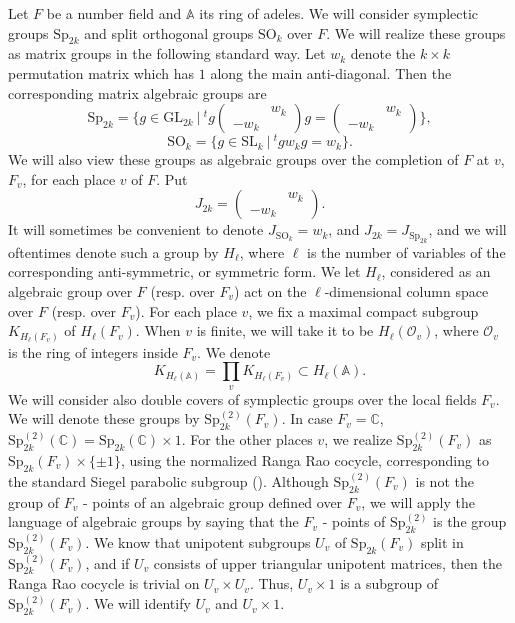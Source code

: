 \documentclass[12pts]{amsart}
\newcommand{\BA}{{\mathbb {A}}}
\newcommand{\BC}{{\mathbb {C}}}
\newcommand{\GL}{{\mathrm{GL}}}
\newcommand{\SL}{{\mathrm{SL}}}
\newcommand{\SO}{{\mathrm{SO}}}
\newcommand{\Sp}{{\mathrm{Sp}}}
\begin{document}
Let $F$ be a number field and $\BA$ its ring of adeles. We will
consider symplectic groups $\Sp_{2k}$ and split orthogonal groups
$\SO_k$ over $F$. We will realize these groups as matrix groups in
the following standard way. Let $w_k$ denote the $k\times k$
permutation matrix which has $1$ along the main anti-diagonal. Then
the corresponding matrix algebraic groups are
$$      
\Sp_{2k}=\{g\in \GL_{2k} \ |\
{}^tg\begin{pmatrix}&w_k\\-w_k\end{pmatrix}g=\begin{pmatrix}&w_k\\-w_k\end{pmatrix}
\},
$$
$$              
 \SO_k=\{g\in \SL_k \ |\ {}^tgw_kg=w_k\}.
$$
We will also view these groups as algebraic groups over the completion of $F$ at $v$, $F_v$, for each place $v$ of $F$. Put
\begin{equation}\label{1'.1}
J_{2k}=\begin{pmatrix}&w_k\\-w_k\end{pmatrix}.
\end{equation}
It will sometimes be convenient to denote $J_{\SO_k}=w_k$, and  $J_{2k}=J_{\Sp_{2k}}$, and
we will oftentimes denote such a group by $H_\ell$, where $\ell$ is the
number of variables of the corresponding anti-symmetric, or
symmetric form. We let $H_\ell$, considered as an algebraic group over $F$ (resp. over $F_v$) act on the $\ell$-dimensional column space over $F$ (resp. over $F_v$).  
For each place $v$, we fix a maximal compact subgroup $K_{H_\ell(F_v)}$ of $H_\ell(F_v)$. When $v$ is finite, we will take it to be $H_\ell(\mathcal{O}_v)$, where $\mathcal{O}_v$ is the ring of integers inside $F_v$. We denote
\begin{equation}\label{1'.2}
K_{H_\ell(\BA)}=\prod_v K_{H_\ell(F_v)}\subset H_\ell(\BA).
\end{equation}
We will consider also double covers of symplectic groups over the local fields $F_v$. We will denote these groups by $\Sp^{(2)}_{2k}(F_v)$. In case $F_v=\BC$, $\Sp_{2k}^{(2)}(\BC)=\Sp_{2k}(\BC)\times 1$. For the other places $v$, we realize $\Sp^{(2)}_{2k}(F_v)$ as $\Sp_{2k}(F_v)\times \{\pm 1\}$, using the normalized Ranga Rao cocycle, corresponding to the standard Siegel parabolic subgroup (\cite{Rao93}). Although $\Sp^{(2)}_{2k}(F_v)$ is not the group of $F_v$ - points of an algebraic group defined over $F_v$, we will apply the language of algebraic groups by saying that the $F_v$ - points of $\Sp_{2k}^{(2)}$ is the group $\Sp_{2k}^{(2)}(F_v)$. 
We know that unipotent subgroups $U_v$ of $\Sp_{2k}(F_v)$ split in $\Sp^{(2)}_{2k}(F_v)$, and if $U_v$ consists of upper triangular unipotent matrices, then the Ranga Rao cocycle is trivial on $U_v\times U_v$. Thus, $U_v\times 1$ is a subgroup of $\Sp^{(2)}_{2k}(F_v)$.  We will identify $U_v$ and $U_v\times 1$.
\end{document}
